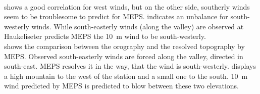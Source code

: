 \\
 shows a good correlation for west winds, but on the other side, southerly winds seem to be troublesome to predict for MEPS.  indicates an unbalance for south-westerly winds. While south-easterly winds (along the valley) are observed at Haukeliseter predicts MEPS the \SI{10}{\metre} wind to be south-westerly. 
\\
 shows the comparison between the orography and the resolved topography by MEPS. Observed south-easterly winds are forced along the valley, directed in south-east. MEPS resolves it in the way, that the wind is south-westerly.  displays a high mountain to the west of the station and a small one to the south. \SI{10}{\metre} wind predicted by MEPS is predicted to blow between these two elevations.
